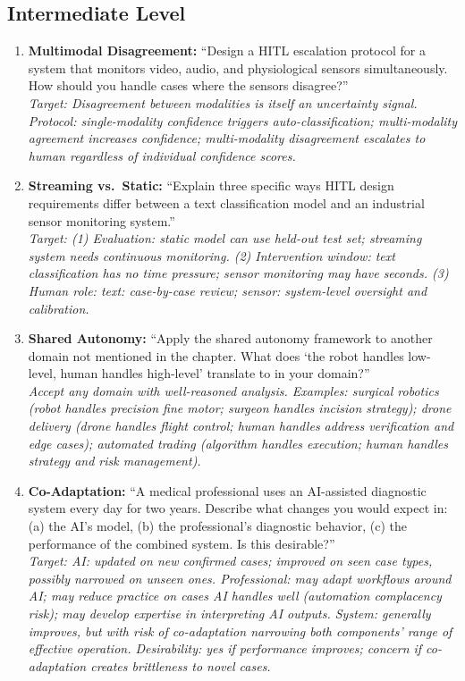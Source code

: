 \subsection{Intermediate Level}

\begin{enumerate}
    \item \textbf{Multimodal Disagreement:} ``Design a HITL escalation protocol for a system that monitors video, audio, and physiological sensors simultaneously. How should you handle cases where the sensors disagree?''\\
    \textit{Target: Disagreement between modalities is itself an uncertainty signal. Protocol: single-modality confidence triggers auto-classification; multi-modality agreement increases confidence; multi-modality disagreement escalates to human regardless of individual confidence scores.}

    \item \textbf{Streaming vs.\ Static:} ``Explain three specific ways HITL design requirements differ between a text classification model and an industrial sensor monitoring system.''\\
    \textit{Target: (1) Evaluation: static model can use held-out test set; streaming system needs continuous monitoring. (2) Intervention window: text classification has no time pressure; sensor monitoring may have seconds. (3) Human role: text: case-by-case review; sensor: system-level oversight and calibration.}

    \item \textbf{Shared Autonomy:} ``Apply the shared autonomy framework to another domain not mentioned in the chapter. What does `the robot handles low-level, human handles high-level' translate to in your domain?''\\
    \textit{Accept any domain with well-reasoned analysis. Examples: surgical robotics (robot handles precision fine motor; surgeon handles incision strategy); drone delivery (drone handles flight control; human handles address verification and edge cases); automated trading (algorithm handles execution; human handles strategy and risk management).}

    \item \textbf{Co-Adaptation:} ``A medical professional uses an AI-assisted diagnostic system every day for two years. Describe what changes you would expect in: (a) the AI's model, (b) the professional's diagnostic behavior, (c) the performance of the combined system. Is this desirable?''\\
    \textit{Target: AI: updated on new confirmed cases; improved on seen case types, possibly narrowed on unseen ones. Professional: may adapt workflows around AI; may reduce practice on cases AI handles well (automation complacency risk); may develop expertise in interpreting AI outputs. System: generally improves, but with risk of co-adaptation narrowing both components' range of effective operation. Desirability: yes if performance improves; concern if co-adaptation creates brittleness to novel cases.}
\end{enumerate}

